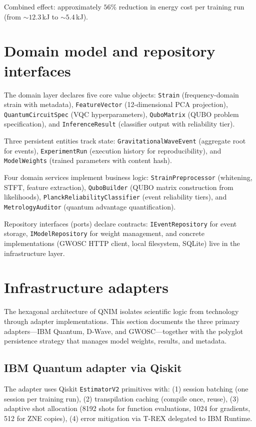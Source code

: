 \documentclass[11pt,a4paper, english]{book}
\theoremstyle{plain}
\theoremstyle{definition}
\numberwithin{equation}{chapter}
\numberwithin{figure}{chapter}
\numberwithin{table}{chapter}
\begin{document}
Combined effect: approximately $56\%$ reduction in energy cost per training run
(from $\sim\!12.3$\,kJ to $\sim\!5.4$\,kJ).

\section{Domain model and repository interfaces}
\label{app:sec:domain-model}

The domain layer declares five core value objects:
\texttt{Strain} (frequency-domain strain with metadata),
\texttt{FeatureVector} (12-dimensional PCA projection),
\texttt{QuantumCircuitSpec} (VQC hyperparameters),
\texttt{QuboMatrix} (QUBO problem specification),
and \texttt{InferenceResult} (classifier output with reliability tier).

Three persistent entities track state:
\texttt{GravitationalWaveEvent} (aggregate root for events),
\texttt{ExperimentRun} (execution history for reproducibility),
and \texttt{ModelWeights} (trained parameters with content hash).

Four domain services implement business logic:
\texttt{StrainPreprocessor} (whitening, STFT, feature extraction),
\texttt{QuboBuilder} (QUBO matrix construction from likelihoods),
\texttt{PlanckReliabilityClassifier} (event reliability tiers),
and \texttt{MetrologyAuditor} (quantum advantage quantification).

Repository interfaces (ports) declare contracts:
\texttt{IEventRepository} for event storage,
\texttt{IModelRepository} for weight management,
and concrete implementations (GWOSC HTTP client, local filesystem, SQLite)
live in the infrastructure layer.

\section{Infrastructure adapters}
\label{app:sec:adapters}
The hexagonal architecture of QNIM isolates scientific logic from technology through adapter implementations. This section documents the three primary adapters---IBM Quantum, D-Wave, and GWOSC---together with the polyglot persistence strategy that manages model weights, results, and metadata.
\subsection{IBM Quantum adapter via Qiskit}
The adapter uses Qiskit \texttt{EstimatorV2} primitives with:
(1) session batching (one session per training run),
(2) transpilation caching (compile once, reuse),
(3) adaptive shot allocation (8192 shots for function evaluations,
1024 for gradients, 512 for ZNE copies),
(4) error mitigation via T-REX delegated to IBM Runtime.
\end{document}
